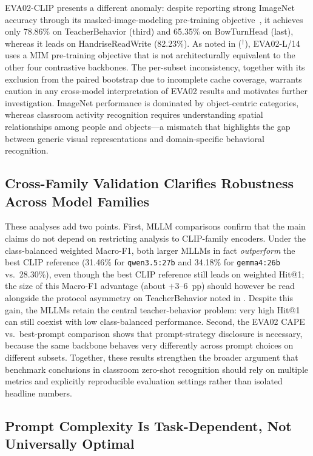\documentclass[symmetry,article,submit,pdftex,moreauthors]{Definitions/mdpi}
\begin{document}
EVA02-CLIP presents a different anomaly: despite reporting strong ImageNet accuracy through its masked-image-modeling pre-training objective~\cite{sun2023eva02}, it achieves only 78.86\% on TeacherBehavior (third) and 65.35\% on BowTurnHead (last), whereas it leads on HandriseReadWrite (82.23\%). As noted in  ($^{\dagger}$), EVA02-L/14 uses a MIM pre-training objective that is not architecturally equivalent to the other four contrastive backbones. The per-subset inconsistency, together with its exclusion from the paired bootstrap due to incomplete cache coverage, warrants caution in any cross-model interpretation of EVA02 results and motivates further investigation.
ImageNet performance is dominated by object-centric categories, whereas classroom activity recognition requires understanding spatial relationships among people and objects---a mismatch that highlights the gap between generic visual representations and domain-specific behavioral recognition.

\subsection{Cross-Family Validation Clarifies Robustness Across Model Families}

These analyses add two points. First, MLLM comparisons confirm that the main claims do not depend on restricting analysis to CLIP-family encoders. Under the class-balanced weighted Macro-F1, both larger MLLMs in fact \emph{outperform} the best CLIP reference (31.46\% for \texttt{qwen3.5:27b} and 34.18\% for \texttt{gemma4:26b} vs.\ 28.30\%), even though the best CLIP reference still leads on weighted Hit@1; the size of this Macro-F1 advantage (about $+3$--$6$~pp) should however be read alongside the protocol asymmetry on TeacherBehavior noted in . Despite this gain, the MLLMs retain the central teacher-behavior problem: very high Hit@1 can still coexist with low class-balanced performance. Second, the EVA02 CAPE vs.\ best-prompt comparison shows that prompt-strategy disclosure is necessary, because the same backbone behaves very differently across prompt choices on different subsets. Together, these results strengthen the broader argument that benchmark conclusions in classroom zero-shot recognition should rely on multiple metrics and explicitly reproducible evaluation settings rather than isolated headline numbers.

\subsection{Prompt Complexity Is Task-Dependent, Not Universally Optimal}
\end{document}
